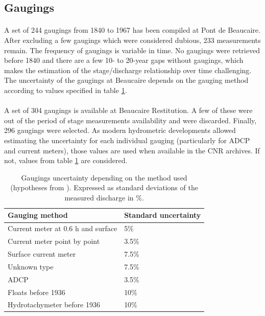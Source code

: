 \documentclass[11pt]{article}
\begin{document}
    \subsection{Gaugings}

    \paragraph{}
    A set of 244 gaugings from 1840 to 1967 has been compiled at Pont de Beaucaire. After excluding a few gaugings which were considered dubious, 233 measurements remain. The frequency of gaugings is variable in time. No gaugings were retrieved before 1840 and there are a few 10- to 20-year gaps without gaugings, which makes the estimation of the stage/discharge relationship over time challenging. The uncertainty of the gaugings at Beaucaire depends on the gauging method according to \citet{bard_actualisation_2018} values specified in table \ref{TabIcJau}.
    
    \paragraph{}    
    A set of 304 gaugings is available at Beaucaire Restitution. A few of these were out of the period of stage measurements availability and were discarded. Finally, 296 gaugings were selected. As modern hydrometric developments allowed estimating the uncertainty for each individual gauging (particularly for ADCP and current meters), those values are used when available in the CNR archives. If not, values from table \ref{TabIcJau} are considered. 
        
         \begin{table}[ht]
            \centering
                \begin{tabular}{| l | l |} 
                        \hline
                        \textbf{Gauging method} & \textbf{Standard uncertainty} \\
                        \hline
                        Current meter at 0.6 h and surface & 5\% \\
                        \hline
                        Current meter point by point & 3.5\% \\
                        \hline
                        Surface current meter & 7.5\% \\
                        \hline
                        Unknown type & 7.5\% \\
                        \hline
                        ADCP & 3.5\% \\
                        \hline
                        Floats before 1936 & 10\% \\
                        \hline
                        Hydrotachymeter before 1936 & 10\%\\
                        \hline
                \end{tabular}
            \caption{Gaugings uncertainty depending on the method used (hypotheses from \citet{bard_actualisation_2018}). Expressed as standard deviations of the measured discharge in \%.}
            \label{TabIcJau}
        \end{table}
 
\end{document}
